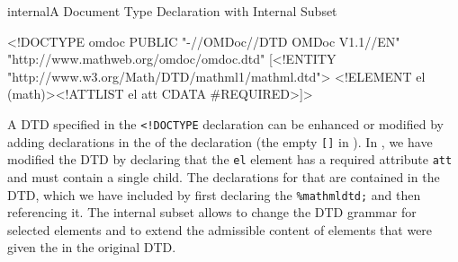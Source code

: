 \begin{myfig}{internal}{A Document Type Declaration with Internal Subset}
\small
\begin{boxedverbatim}
<!DOCTYPE omdoc PUBLIC "-//OMDoc//DTD OMDoc V1.1//EN" 
                       "http://www.mathweb.org/omdoc/omdoc.dtd" 
  [<!ENTITY %
              "http://www.w3.org/Math/DTD/mathml1/mathml.dtd">
   <!ELEMENT el (math)><!ATTLIST el att CDATA #REQUIRED>]> 
\end{boxedverbatim}
\end{myfig}
A DTD specified in the {\tt{<!DOCTYPE}} declaration can be enhanced or modified by
adding declarations in the {}
of the {} declaration (the empty {\tt{[]}} in
{}).\label{page:internal-dtd} In {}, we have
modified the DTD by declaring that the {\tt{el}} element has a required attribute
{\tt{att}} and must contain a single {} child. The declarations for
that are contained in the {\mathml} DTD, which we have included by first declaring
the {} {\tt{\%mathmldtd;}} and then referencing it. The
internal subset allows to change the DTD grammar for selected elements and to
extend the admissible content of elements that were given the {} in the original DTD.

